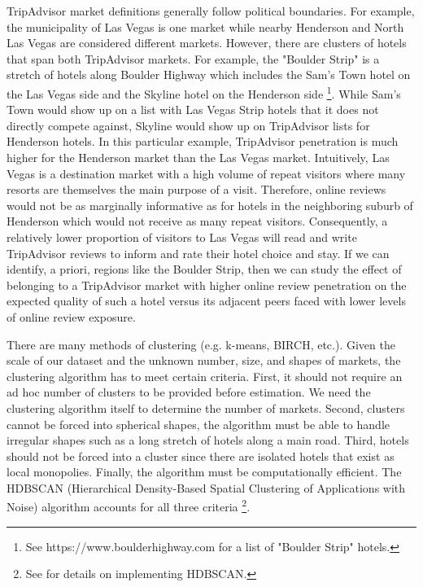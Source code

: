 \documentclass[mksc,blindrev]{informs3} %
\begin{document}
TripAdvisor market definitions generally follow political boundaries. For example, the municipality of Las Vegas is one market while nearby Henderson and North Las Vegas are considered different markets. However, there are clusters of hotels that span both TripAdvisor markets. For example, the "Boulder Strip" is a stretch of hotels along Boulder Highway which includes the Sam's Town hotel on the Las Vegas side and the Skyline hotel on the Henderson side \footnote{See https://www.boulderhighway.com for a list of "Boulder Strip" hotels.}. While Sam's Town would show up on a list with Las Vegas Strip hotels that it does not directly compete against, Skyline would show up on TripAdvisor lists for Henderson hotels. In this particular example, TripAdvisor penetration is much higher for the Henderson market than the Las Vegas market. Intuitively, Las Vegas is a destination market with a high volume of repeat visitors where many resorts are themselves the main purpose of a visit. Therefore, online reviews would not be as marginally informative as for hotels in the neighboring suburb of Henderson which would not receive as many repeat visitors. Consequently, a relatively lower proportion of visitors to Las Vegas will read and write TripAdvisor reviews to inform and rate their hotel choice and stay. If we can identify, a priori, regions like the Boulder Strip, then we can study the effect of belonging to a TripAdvisor market with higher online review penetration on the expected quality of such a hotel versus its adjacent peers faced with lower levels of online review exposure.

There are many methods of clustering (e.g. k-means, BIRCH, etc.). Given the scale of our dataset and the unknown number, size, and shapes of markets, the clustering algorithm has to meet certain criteria. First, it should not require an ad hoc number of clusters to be provided before estimation. We need the clustering algorithm itself to determine the number of markets. Second, clusters cannot be forced into spherical shapes, the algorithm must be able to handle irregular shapes such as a long stretch of hotels along a main road.  Third, hotels should not be forced into a cluster since there are isolated hotels that exist as local monopolies. Finally, the algorithm must be computationally efficient.  The HDBSCAN (Hierarchical Density-Based Spatial Clustering of Applications with Noise) algorithm accounts for all three criteria \citep{campello2013density,mcinnes2017hdbscan}\footnote{See \citet{mcinnes2017hdbscan} for details on implementing HDBSCAN.}. 
\end{document}
